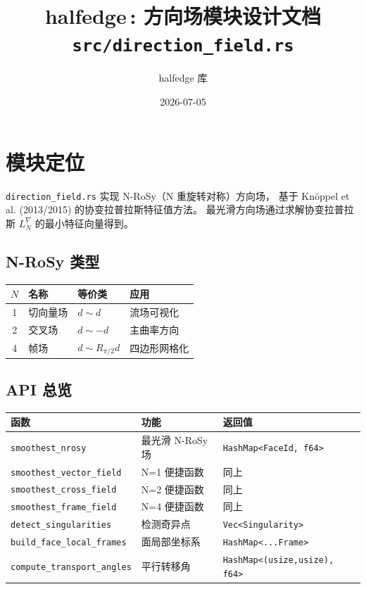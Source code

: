 \documentclass[11pt,a4paper]{article}
\title{\textbf{halfedge\,: 方向场模块设计文档} \\ \large \texttt{src/direction\_field.rs}}
\author{halfedge 库}
\date{2026-07-05}
\begin{document}
\maketitle
\tableofcontents

\section{模块定位}

\texttt{direction\_field.rs} 实现 N-RoSy（N 重旋转对称）方向场，
基于 Knöppel et al. (2013/2015) 的协变拉普拉斯特征值方法。
最光滑方向场通过求解协变拉普拉斯 $L^\nabla_N$ 的最小特征向量得到。

\subsection{N-RoSy 类型}

\begin{center}
\renewcommand{\arraystretch}{1.18}
\begin{tabular}{@{}clll@{}}
  \toprule
  $N$ & 名称 & 等价类 & 应用 \\
  \midrule
  1 & 切向量场 & $d \sim d$ & 流场可视化 \\
  2 & 交叉场 & $d \sim -d$ & 主曲率方向 \\
  4 & 帧场 & $d \sim R_{\pi/2}d$ & 四边形网格化 \\
  \bottomrule
\end{tabular}
\end{center}

\subsection{API 总览}

\begin{center}
\renewcommand{\arraystretch}{1.18}
\begin{tabular}{@{}lp{4.2cm}l@{}}
  \toprule
  \textbf{函数} & \textbf{功能} & \textbf{返回值} \\
  \midrule
  \texttt{smoothest\_nrosy} & 最光滑 N-RoSy 场 & \texttt{HashMap<FaceId, f64>} \\
  \texttt{smoothest\_vector\_field} & N=1 便捷函数 & 同上 \\
  \texttt{smoothest\_cross\_field} & N=2 便捷函数 & 同上 \\
  \texttt{smoothest\_frame\_field} & N=4 便捷函数 & 同上 \\
  \texttt{detect\_singularities} & 检测奇异点 & \texttt{Vec<Singularity>} \\
  \texttt{build\_face\_local\_frames} & 面局部坐标系 & \texttt{HashMap<...Frame>} \\
  \texttt{compute\_transport\_angles} & 平行转移角 & \texttt{HashMap<(usize,usize), f64>} \\
  \bottomrule
\end{tabular}
\end{center}
\end{document}
